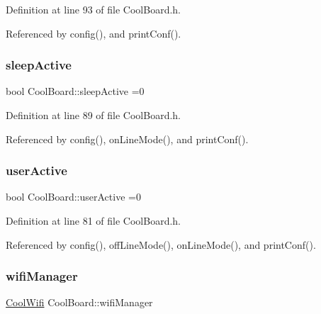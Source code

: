 Definition at line 93 of file Cool\+Board.\+h.



Referenced by config(), and print\+Conf().

\mbox{\label{classCoolBoard_a0a51b2287139f66c738101fb53139230}} 
\subsubsection{\texorpdfstring{sleep\+Active}{sleepActive}}
{\footnotesize\ttfamily bool Cool\+Board\+::sleep\+Active =0\hspace{0.3cm}{\ttfamily [private]}}



Definition at line 89 of file Cool\+Board.\+h.



Referenced by config(), on\+Line\+Mode(), and print\+Conf().

\mbox{\label{classCoolBoard_a6395459131d6889a3005f79c7a35e964}} 
\subsubsection{\texorpdfstring{user\+Active}{userActive}}
{\footnotesize\ttfamily bool Cool\+Board\+::user\+Active =0\hspace{0.3cm}{\ttfamily [private]}}



Definition at line 81 of file Cool\+Board.\+h.



Referenced by config(), off\+Line\+Mode(), on\+Line\+Mode(), and print\+Conf().

\mbox{\label{classCoolBoard_acd88e6003606b47479ebba81e4aceeca}} 
\subsubsection{\texorpdfstring{wifi\+Manager}{wifiManager}}
{\footnotesize\ttfamily \hyperlink{classCoolWifi}{Cool\+Wifi} Cool\+Board\+::wifi\+Manager\hspace{0.3cm}{\ttfamily [private]}}



